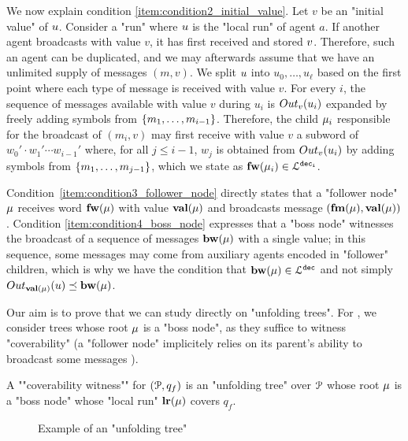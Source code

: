 We now explain condition \ref{item:condition2_initial_value}. Let $v$ be an "initial value" of $u$. Consider a "run" where $u$ is the "local run" of agent $a$. If another agent broadcasts with value $v$, it has first received and stored $v$. Therefore, such an agent can be duplicated, and we may afterwards assume that we have an unlimited supply of messages $(m,v)$.
We split $u$ into $u_0,\dots,u_\ell$ based on the first point where each type of message is received with value $v$. For every $i$, the sequence of messages available with value $v$ during $u_i$ is $\voutput{v}{u_i}$ expanded by freely adding symbols from $\{m_1,\dots, m_{i-1}\}$. Therefore, the child $\mu_i$ responsible for the broadcast of $(m_i,v)$ may first receive with value $v$ a subword of $w_0' \cdot w_1' \cdots w_{i-1}'$ where, for all $j \leq i-1$, $w_j$ is obtained from $\voutput{v}{u_i}$ by adding symbols from $\{m_1, \dots, m_{j-1}\}$, which we state as $\mathbf{fw}(\mu_i) \in \mathcal{L}^{\mathtt{\mathtt{dec}_i}}$.   

Condition~\ref{item:condition3_follower_node} directly states that a "follower node" $\mu$ receives word $\mathbf{fw}(\mu)$ with value $\mathbf{val}(\mu)$ and broadcasts message $(\mathbf{fm}(\mu), \mathbf{val}(\mu))$. Condition \ref{item:condition4_boss_node} expresses that a "boss node" witnesses the broadcast of a sequence of messages $\mathbf{bw}(\mu)$ with a single value; in this sequence, some messages may come from auxiliary agents encoded in "follower" children, which is why we have the condition that $\mathbf{bw}(\mu) \in \mathcal{L}^{\mathtt{\mathtt{dec}}}$ and not simply $ \voutput{\valuelabel{\node}}{\localrun} \subword \bosslabel{\node}$. 

Our aim is to prove that we can study \COVER directly on "unfolding trees". For \COVER, we consider trees whose root $\mu$ is a "boss node", as they suffice to witness "coverability" (a "follower node" implicitely relies on its parent's ability to broadcast some messages ). 

\begin{definition}
\label{def:cov_witness}
A ""coverability witness"" for $(\mathcal{P}, q_f)$ is an "unfolding tree" over $\mathcal{P}$ whose root $\mu$ is a "boss node" whose "local run" $\mathbf{lr}(\mu)$ covers $q_f$. 
\end{definition}

\begin{figure}
	\begin{center}
	\resizebox{\textwidth}{!}{
		
	}
	\end{center}
	\caption{Example of an "unfolding tree"}\label{fig-ex-unfolding-tree}
\end{figure}

